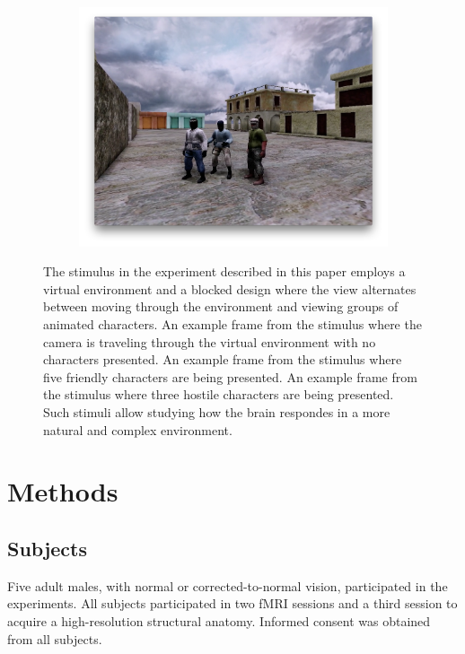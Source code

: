 \documentclass[5p,authoryear]{elsarticle}
\begin{document}
\begin{figure}
\begin{subfigure}{0.3\textwidth}
\includegraphics[width=\textwidth]{figures/stimulus-three-insurgents}
\caption{}
\label{fig:stimulus-three-insurgents}
\end{subfigure}
\caption{
The stimulus in the experiment described in this paper employs a virtual environment and a blocked design where the view alternates between moving through the environment and viewing groups of animated characters.
 An example frame from the stimulus where the camera is traveling through the virtual environment with no characters presented.
 An example frame from the stimulus where five friendly characters are being presented.
 An example frame from the stimulus where three hostile characters are being presented.
Such stimuli allow studying how the brain respondes in a more natural and complex environment.
}
\label{fig:stimulus}
\end{figure}

\section{Methods}

\subsection{Subjects}
Five adult males, with normal or corrected-to-normal vision, participated in the experiments. 
All subjects participated in two fMRI sessions and a third session to acquire a high-resolution structural anatomy. 
Informed consent was obtained from all subjects.
\end{document}
